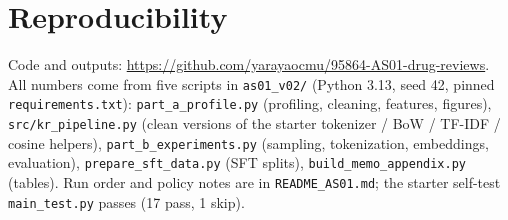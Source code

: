 \documentclass[11pt]{article}
\newcommand{\code}[1]{\texttt{#1}}
\begin{document}
\section{Reproducibility}
Code and outputs: \url{https://github.com/yarayaocmu/95864-AS01-drug-reviews}.
All numbers come from five scripts in \code{as01\_v02/} (Python 3.13, seed 42, pinned \code{requirements.txt}): \code{part\_a\_profile.py} (profiling, cleaning, features, figures), \code{src/kr\_pipeline.py} (clean versions of the starter tokenizer / BoW / TF-IDF / cosine helpers), \code{part\_b\_experiments.py} (sampling, tokenization, embeddings, evaluation), \code{prepare\_sft\_data.py} (SFT splits), \code{build\_memo\_appendix.py} (tables). Run order and policy notes are in \code{README\_AS01.md}; the starter self-test \code{main\_test.py} passes (17 pass, 1 skip).
\end{document}
